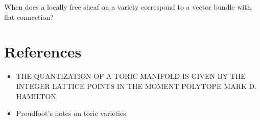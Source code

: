 \documentclass[12pt]{article}
\begin{document}
\begin{remark}
    When does a locally free sheaf on a variety correspond to a vector bundle with flat connection?
\end{remark}

\section{References}
\begin{itemize}
    \item THE QUANTIZATION OF A TORIC MANIFOLD IS GIVEN BY THE INTEGER LATTICE POINTS IN THE MOMENT
    POLYTOPE MARK D. HAMILTON
    \item Proudfoot's notes on toric varieties
\end{itemize}
\end{document}
